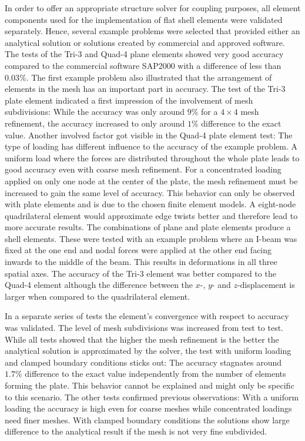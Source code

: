   In order to offer an appropriate structure solver for coupling purposes, all element components used for the implementation of flat shell elements were validated separately. Hence, several example problems were selected that provided either an analytical solution or solutions created by commercial and approved software. The tests of the Tri-3 and Quad-4 plane elements showed very good accuracy compared to the commercial software SAP2000 with a difference of less than $0.03\%$. The first example problem also illustrated that the arrangement of elements in the mesh has an important part in accuracy. The test of the Tri-3 plate element indicated a first impression of the involvement of mesh subdivisions: While the accuracy was only around $9\%$ for a $4\!\times\!4$ mesh refinement, the accuracy increased to only around $1\%$ difference to the exact value. Another involved factor got visible in the Quad-4 plate element test: The type of loading has different influence to the accuracy of the example problem. A uniform load where the forces are distributed throughout the whole plate leads to good accuracy even with coarse mesh refinement. For a concentrated loading applied on only one node at the center of the plate, the mesh refinement must be increased to gain the same level of accuracy. This behavior can only be observed with plate elements and is due to the chosen finite element models. A eight-node quadrilateral element would approximate edge twists better and therefore lead to more accurate results. The combinations of plane and plate elements produce a shell elements. These were tested with an example problem where an I-beam was fixed at the one end and nodal forces were applied at the other end facing inwards to the middle of the beam. This results in deformations in all three spatial axes. The accuracy of the Tri-3 element was better compared to the Quad-4 element although the difference between the $x$-, $y$- and $z$-displacement is larger when compared to the quadrilateral element.

  In a separate series of tests the element's convergence with respect to accuracy was validated. The level of mesh subdivisions was increased from test to test. While all tests showed that the higher the mesh refinement is the better the analytical solution is approximated by the solver, the test with uniform loading and clamped boundary conditions sticks out: The accuracy stagnates around $1.7\%$ difference to the exact value independently from the number of elements forming the plate. This behavior cannot be explained and might only be specific to this scenario. The other tests confirmed previous observations: With a uniform loading the accuracy is high even for coarse meshes while concentrated loadings need finer meshes. With clamped boundary conditions the solutions show large difference to the analytical result if the mesh is not very fine subdivided.
  
